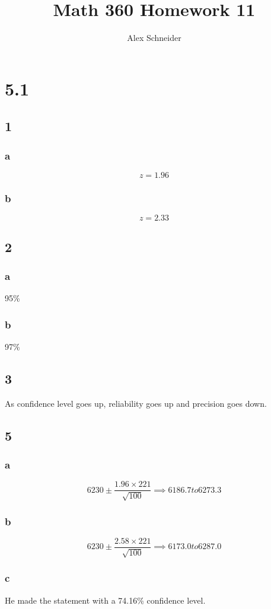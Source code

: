 \documentclass[11pt]{article}
\title{Math 360 Homework 11}
\author{Alex Schneider}
\begin{document}
\maketitle
\section*{5.1}
\subsection*{1}
\subsubsection*{a}
\[ z = 1.96 \]
\subsubsection*{b}
\[ z = 2.33 \]
\subsection*{2}
\subsubsection*{a}
95\%
\subsubsection*{b}
97\%
\subsection*{3}
As confidence level goes up, reliability goes up and precision goes down.

\subsection*{5}
\subsubsection*{a}
\[ 6230 \pm \frac{1.96 \times 221}{\sqrt{100}} \implies 6186.7 to 6273.3 \]
\subsubsection*{b}
\[ 6230 \pm \frac{2.58 \times 221}{\sqrt{100}} \implies 6173.0 to 6287.0 \]
\subsubsection*{c}
He made the statement with a 74.16\% confidence level. 
\end{document}
